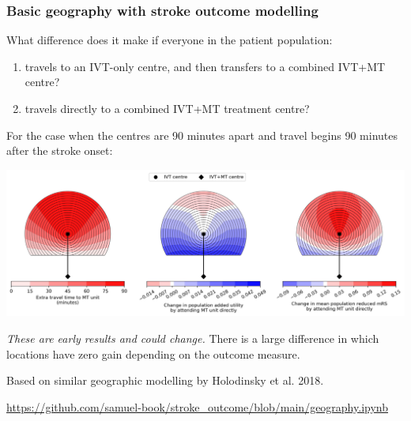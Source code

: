 \documentclass[xcolor={usenames,dvipsnames}]{beamer}
\newcommand{\smallurl}[1]{\textcolor{blue}{\fontsize{4pt}{4.8pt}\selectfont \url{#1}}}
\begin{document}
\begin{frame}
\end{frame}





\begin{frame}
\frametitle{Basic geography with stroke outcome modelling}

\footnotesize{What difference does it make if everyone in the patient population:}
\begin{enumerate}
    \footnotesize
    \item travels to an IVT-only centre, and then transfers to a combined IVT+MT centre? 
    \item travels directly to a combined IVT+MT treatment centre? 
\end{enumerate} 

\footnotesize{For the case when the centres are 90 minutes apart and travel begins 90 minutes after the stroke onset:}

\begin{center}
\includegraphics[width=\textwidth]{./images/circle_plots_t-IVT-to-MT=90_t-onset-to-ambo=90}
\end{center} 




\footnotesize{\emph{These are early results and could change.} There is a large difference in which locations have zero gain depending on the outcome measure.}

\vspace{0.5em}
\tiny{Based on similar geographic modelling by Holodinsky et al. 2018.}

\smallurl{https://github.com/samuel-book/stroke_outcome/blob/main/geography.ipynb}

\end{frame}


\end{document}
